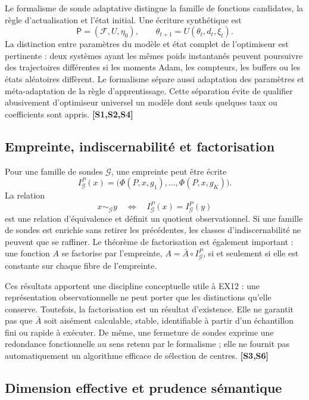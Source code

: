 \documentclass[11pt,a4paper]{article}
\newcommand{\src}[1]{\textbf{[#1]}}
\begin{document}
Le formalisme de sonde adaptative distingue la famille de fonctions candidates, la règle d'actualisation et l'état initial. Une écriture synthétique est
\[
  \mathsf P=(\mathcal F,U,\eta_0),\qquad
  \theta_{t+1}=U(\theta_t,d_t,\xi_t).
\]
La distinction entre paramètres du modèle et état complet de l'optimiseur est pertinente : deux systèmes ayant les mêmes poids instantanés peuvent poursuivre des trajectoires différentes si les moments Adam, les compteurs, les buffers ou les états aléatoires diffèrent. Le formalisme sépare aussi adaptation des paramètres et méta-adaptation de la règle d'apprentissage. Cette séparation évite de qualifier abusivement d'optimiseur universel un modèle dont seuls quelques taux ou coefficients sont appris. \src{S1,S2,S4}

\subsection{Empreinte, indiscernabilité et factorisation}

Pour une famille de sondes \(\mathcal G\), une empreinte peut être écrite
\[
 I_{\mathcal G}^{P}(x)=\bigl(\Phi(P,x,g_1),\ldots,\Phi(P,x,g_K)\bigr).
\]
La relation
\[
 x\sim_{\mathcal G}y\quad\Longleftrightarrow\quad
 I_{\mathcal G}^{P}(x)=I_{\mathcal G}^{P}(y)
\]
est une relation d'équivalence et définit un quotient observationnel. Si une famille de sondes est enrichie sans retirer les précédentes, les classes d'indiscernabilité ne peuvent que se raffiner. Le théorème de factorisation est également important : une fonction \(A\) se factorise par l'empreinte, \(A=\bar A\circ I_{\mathcal G}^{P}\), si et seulement si elle est constante sur chaque fibre de l'empreinte.

Ces résultats apportent une discipline conceptuelle utile à EX12 : une représentation observationnelle ne peut porter que les distinctions qu'elle conserve. Toutefois, la factorisation est un résultat d'existence. Elle ne garantit pas que \(\bar A\) soit aisément calculable, stable, identifiable à partir d'un échantillon fini ou rapide à exécuter. De même, une fermeture de sondes exprime une redondance fonctionnelle au sens retenu par le formalisme ; elle ne fournit pas automatiquement un algorithme efficace de sélection de centres. \src{S3,S6}

\subsection{Dimension effective et prudence sémantique}
\end{document}
